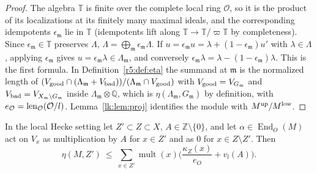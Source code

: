 \begin{proof}
The algebra $\mathbb T$ is finite over the complete local ring $\mathcal O$, so it is the product of its localizations at its finitely many maximal ideals, and the corresponding idempotents $\epsilon_{\mathfrak m}$ lie in $\mathbb T$ (idempotents lift along $\mathbb T\to\mathbb T/\varpi\mathbb T$ by completeness). Since $\epsilon_{\mathfrak m}\in\mathbb T$ preserves $\Lambda$, $\Lambda=\bigoplus_{\mathfrak m}\epsilon_{\mathfrak m}\Lambda$. If $u=\epsilon_{\mathfrak m}u=\lambda+(1-\epsilon_{\mathfrak m})u'$ with $\lambda\in\Lambda$, applying $\epsilon_{\mathfrak m}$ gives $u=\epsilon_{\mathfrak m}\lambda\in\Lambda_{\mathfrak m}$, and conversely $\epsilon_{\mathfrak m}\lambda=\lambda-(1-\epsilon_{\mathfrak m})\lambda$. This is the first formula. In Definition~\ref{r5:def:eta} the summand at $\mathfrak m$ is the normalized length of $(V_{\rm good}\cap(\Lambda_{\mathfrak m}+V_{\rm bad}))/(\Lambda_{\mathfrak m}\cap V_{\rm good})$ with $V_{\rm good}=V_{G_{\mathfrak m}}$ and $V_{\rm bad}=V_{X_{\mathfrak m}\setminus G_{\mathfrak m}}$ inside $\Lambda_{\mathfrak m}\otimes\mathbb Q$, which is $\eta(\Lambda_{\mathfrak m},G_{\mathfrak m})$ by definition, with $e_{\mathcal O}=\operatorname{len}_{\mathcal O}(\mathcal O/l)$. Lemma~\ref{lk:lem:proj} identifies the module with $M^{\rm up}/M^{\rm low}$.
\end{proof}

\begin{proposition}\label{lk:prop:hlb}
In the local Hecke setting let $Z'\subset Z\subset X$, $A\in\mathbb Z\setminus\{0\}$, and let $\alpha\in\operatorname{End}_O(M)$ act on $V_x$ as multiplication by $A$ for $x\in Z'$ and as $0$ for $x\in Z\setminus Z'$. Then
\[
\eta(M,Z')\ \le\ \sum_{x\in Z'}\operatorname{mult}(x)\Big(\frac{\kappa_Z(x)}{e_O}+v_l(A)\Big).
\]
\end{proposition}

